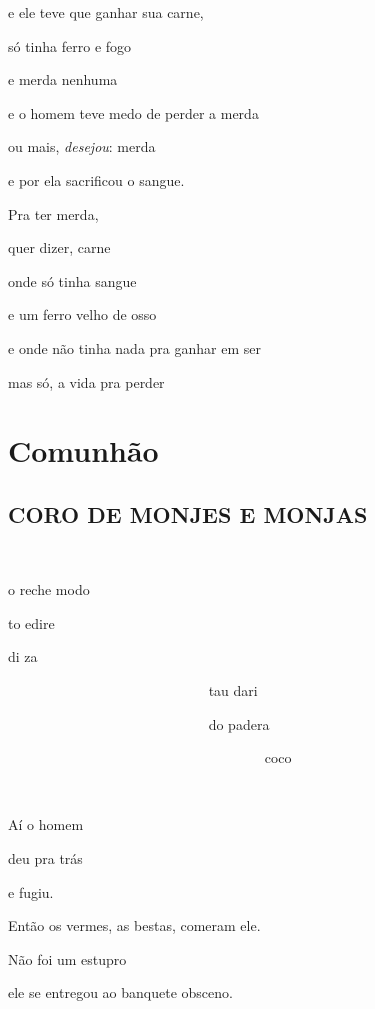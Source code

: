 e ele teve que ganhar sua carne,

só tinha ferro e fogo

e merda nenhuma

e o homem teve medo de perder a merda

ou mais, \emph{desejou}: merda

e por ela sacrificou o sangue.

Pra ter merda, 

quer dizer, carne

onde só tinha sangue

e um ferro velho de osso

e onde não tinha nada pra ganhar em ser 

mas só, a vida pra perder

\chapter{Comunhão}

\section*{CORO DE MONJES E MONJAS}


~

o reche modo

to edire

di za

~~~~~~~~~~~~~~~~~~~~~~~~~~~~ tau dari

~~~~~~~~~~~~~~~~~~~~~~~~~~~~ do padera

~~~~~~~~~~~~~~~~~~~~~~~~~~~~~~~~~~~~ coco~~~~~~~~

~


Aí o homem

deu pra trás

e fugiu.


Então os vermes, as bestas, comeram ele.


Não foi um estupro \EP[2]

ele se entregou ao banquete obsceno.

